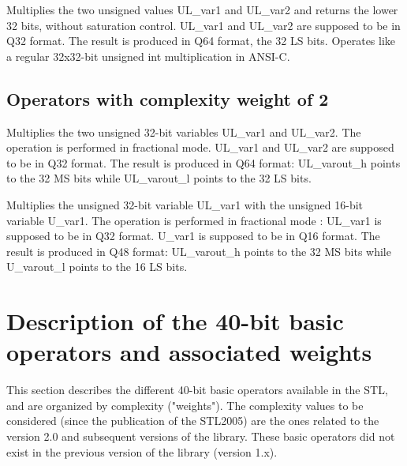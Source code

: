 
Multiplies the two unsigned values UL\_var1 and UL\_var2 and returns the lower 32 bits, without saturation control.
UL\_var1 and UL\_var2 are supposed to be in Q32 format.
The result is produced in Q64 format, the 32 LS bits.
Operates like a regular 32x32-bit unsigned int multiplication in ANSI-C.

\subsection{Operators with complexity weight of 2}


Multiplies the two unsigned 32-bit variables UL\_var1 and UL\_var2.
The operation is performed in fractional mode.
UL\_var1 and UL\_var2 are supposed to be in Q32 format.
The result is produced in Q64 format: UL\_varout\_h points to the 32 MS bits while UL\_varout\_l points to the 32 LS bits.


Multiplies the unsigned 32-bit variable UL\_var1 with the unsigned 16-bit variable U\_var1.
The operation is performed in fractional mode :
UL\_var1 is supposed to be in Q32 format.
U\_var1 is supposed to be in Q16 format.
The result is produced in Q48 format: UL\_varout\_h points to the 32 MS bits while U\_varout\_l points to the 16 LS bits.


\section{Description of the 40-bit basic operators and associated weights}

This section describes the different 40-bit basic operators
available in the STL, and are organized by complexity ("weights").
The complexity values to be considered (since the publication of
the STL2005) are the ones related to the version 2.0 and subsequent versions of the library. These basic operators did not exist in the previous
version of the library (version 1.x).

